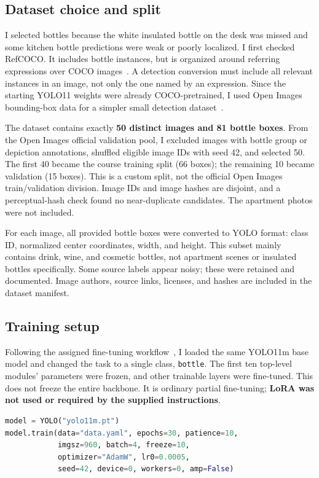 \documentclass[10pt,letterpaper]{article}
\begin{document}
\subsection{Dataset choice and split}
I selected bottles because the white insulated bottle on the desk was missed and some kitchen bottle predictions were weak or poorly localized. I first checked RefCOCO. It includes bottle instances, but is organized around referring expressions over COCO images~\cite{refcoco}. A detection conversion must include all relevant instances in an image, not only the one named by an expression. Since the starting YOLO11 weights were already COCO-pretrained, I used Open Images bounding-box data for a simpler small detection dataset~\cite{openimages}.

The dataset contains exactly \textbf{50 distinct images and 81 bottle boxes}. From the Open Images official validation pool, I excluded images with bottle group or depiction annotations, shuffled eligible image IDs with seed 42, and selected 50. The first 40 became the course training split (66 boxes); the remaining 10 became validation (15 boxes). This is a custom split, not the official Open Images train/validation division. Image IDs and image hashes are disjoint, and a perceptual-hash check found no near-duplicate candidates. The apartment photos were not included.

For each image, all provided bottle boxes were converted to YOLO format: class ID, normalized center coordinates, width, and height. This subset mainly contains drink, wine, and cosmetic bottles, not apartment scenes or insulated bottles specifically. Some source labels appear noisy; these were retained and documented. Image authors, source links, licenses, and hashes are included in the dataset manifest.

\subsection{Training setup}
Following the assigned fine-tuning workflow~\cite{finetutorial}, I loaded the same YOLO11m base model and changed the task to a single class, \texttt{bottle}. The first ten top-level modules' parameters were frozen, and other trainable layers were fine-tuned. This does not freeze the entire backbone. It is ordinary partial fine-tuning; \textbf{LoRA was not used or required by the supplied instructions}.

\begin{lstlisting}[language=Python]
model = YOLO("yolo11m.pt")
model.train(data="data.yaml", epochs=30, patience=10,
            imgsz=960, batch=4, freeze=10,
            optimizer="AdamW", lr0=0.0005,
            seed=42, device=0, workers=0, amp=False)
\end{lstlisting}
\end{document}
